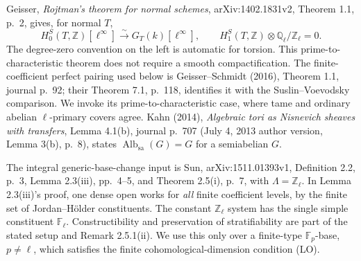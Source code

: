 \documentclass[11pt,a4paper]{article}
\theoremstyle{definition}\newtheorem{definition}[theorem]{Definition}
\theoremstyle{remark}\newtheorem{remark}[theorem]{Remark}
\begin{document}
Geisser, \emph{Rojtman's theorem for normal schemes},
arXiv:1402.1831v2, Theorem 1.1, p.~2, gives, for normal $T$,
\[
 H_0^S(T,\mathbb Z)[\ell^\infty]
       \xrightarrow{\sim}G_T(k)[\ell^\infty],\qquad
 H_1^S(T,\mathbb Z)\otimes\mathbb Q_\ell/\mathbb Z_\ell=0.
                                                               \tag{AQ.14.3}
\]
The degree-zero convention on the left is automatic for
torsion. This prime-to-characteristic theorem does not
require a smooth compactification. The finite-coefficient
perfect pairing used below is Geisser--Schmidt (2016),
Theorem 1.1, journal p.~92; their Theorem 7.1, p.~118, identifies it
with the Suslin--Voevodsky comparison. We invoke its
prime-to-characteristic case, where tame and ordinary
abelian $\ell$-primary covers agree. Kahn (2014),
\emph{Algebraic tori as Nisnevich sheaves with transfers},
Lemma 4.1(b), journal p.~707 (July 4, 2013 author version,
Lemma 3(b), p.~8), states
$\operatorname{Alb}_{\mathrm{sa}}(G)=G$ for a semiabelian $G$.

The integral generic-base-change input is Sun,
arXiv:1511.01393v1, Definition 2.2, p.~3, Lemma 2.3(iii),
pp.~4--5, and Theorem 2.5(i), p.~7, with
$\Lambda=\mathbb Z_\ell$. In Lemma 2.3(iii)'s proof, one
dense open works for \emph{all} finite coefficient levels,
by the finite set of Jordan--H\"older constituents. The
constant $\mathbb Z_\ell$ system has the single simple
constituent $\mathbb F_\ell$. Constructibility and preservation
of stratifiability are part of the stated setup and
Remark 2.5.1(ii). We use this only over a finite-type
$\mathbb F_p$-base, $p\ne\ell$, which satisfies the finite
cohomological-dimension condition (LO).
\end{document}
